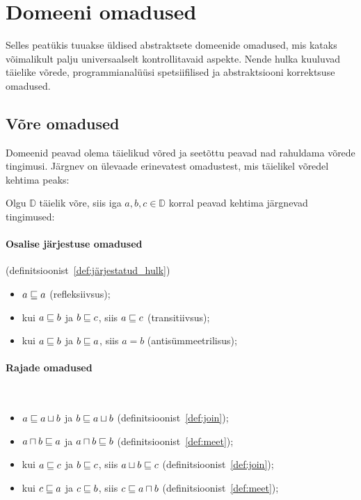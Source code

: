 \documentclass[../thesis.tex]{subfiles}
\begin{document}
\section{Domeeni omadused}
Selles peatükis tuuakse üldised abstraktsete domeenide omadused, mis kataks võimalikult palju universaalselt kontrollitavaid aspekte. Nende hulka kuuluvad täielike võrede, programmianalüüsi spetsiifilised ja abstraktsiooni korrektsuse omadused.

\subsection{Võre omadused}
\label{sec:lattice-props}
Domeenid peavad olema täielikud võred ja seetõttu peavad nad rahuldama võrede tingimusi. Järgnev on ülevaade erinevatest omadustest, mis täielikel võredel kehtima peaks:

\noindent
Olgu $\mathbb{D}$ täielik võre, siis iga $a, b, c \in \mathbb{D}$ korral peavad kehtima järgnevad tingimused:

\paragraph{Osalise järjestuse omadused} (definitsioonist~\ref{def:järjestatud_hulk})
\begin{itemize}[nosep]
	\item $a \sqsubseteq a$ (refleksiivsus);
	\item kui $a \sqsubseteq b$ ja $b \sqsubseteq c$, siis $a \sqsubseteq c$ (transitiivsus);
	\item kui $a \sqsubseteq b$ ja $b \sqsubseteq a$, siis $a = b$ (antisümmeetrilisus);
\end{itemize}

\paragraph{Rajade omadused}~\cite{might_orders}
\begin{itemize}[nosep]
	\item $a \sqsubseteq a \sqcup b$ ja $b \sqsubseteq a \sqcup b$ (definitsioonist~\ref{def:join});
	\item $a \sqcap b \sqsubseteq a$ ja $a \sqcap b \sqsubseteq b$ (definitsioonist~\ref{def:meet});
	\item kui $a \sqsubseteq c$ ja $b \sqsubseteq c$, siis $a \sqcup b \sqsubseteq c$ (definitsioonist~\ref{def:join});
	\item kui $c \sqsubseteq a$ ja $c \sqsubseteq b$, siis $c \sqsubseteq a \sqcap b$ (definitsioonist~\ref{def:meet});
\end{itemize}
\end{document}
